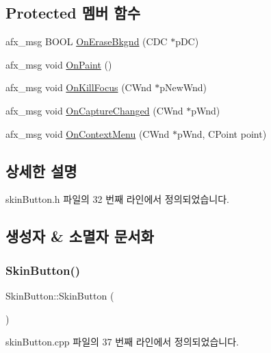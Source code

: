 \subsection*{Protected 멤버 함수}
\begin{DoxyCompactItemize}
\item 
afx\+\_\+msg B\+O\+OL \mbox{\hyperlink{class_skin_button_ad046e6e663c72734fb1dc470d67f6ae0}{On\+Erase\+Bkgnd}} (C\+DC $\ast$p\+DC)
\item 
afx\+\_\+msg void \mbox{\hyperlink{class_skin_button_ac508eb8cb788a169c264f48e202aec37}{On\+Paint}} ()
\item 
afx\+\_\+msg void \mbox{\hyperlink{class_skin_button_ab89eac5d77588b47adfcbb9f664568be}{On\+Kill\+Focus}} (C\+Wnd $\ast$p\+New\+Wnd)
\item 
afx\+\_\+msg void \mbox{\hyperlink{class_skin_button_ad4f3d9812259e8f4a9df22a14ae06c6f}{On\+Capture\+Changed}} (C\+Wnd $\ast$p\+Wnd)
\item 
afx\+\_\+msg void \mbox{\hyperlink{class_skin_button_a1d8e1d9486a36b42c1a1d2a26bde5efa}{On\+Context\+Menu}} (C\+Wnd $\ast$p\+Wnd, C\+Point point)
\end{DoxyCompactItemize}


\subsection{상세한 설명}


skin\+Button.\+h 파일의 32 번째 라인에서 정의되었습니다.



\subsection{생성자 \& 소멸자 문서화}
\mbox{\label{class_skin_button_aa21793524684d86b0ef80fd9e6d57ba7}} 
\subsubsection{\texorpdfstring{Skin\+Button()}{SkinButton()}}
{\footnotesize\ttfamily Skin\+Button\+::\+Skin\+Button (\begin{DoxyParamCaption}{ }\end{DoxyParamCaption})}



skin\+Button.\+cpp 파일의 37 번째 라인에서 정의되었습니다.



